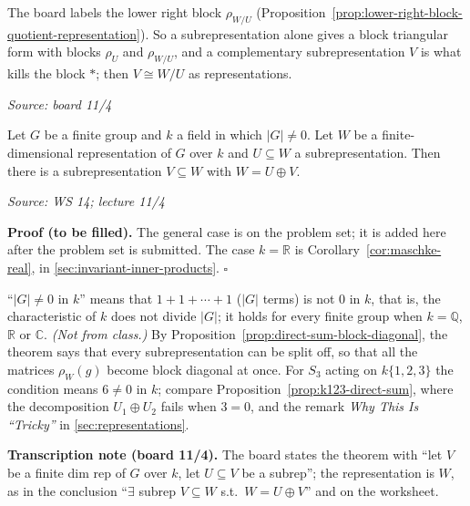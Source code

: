 \documentclass[11pt]{report}
\renewenvironment{proof}[1][Proof]{\noindent\textbf{#1.} }{\hfill$\square$\par\vspace{5pt}}
\newcommand{\srcline}[1]{\par\hfill{\footnotesize\textit{Source: #1}}}
\begin{document}
\begin{rembox}\label{rem:lower-right-block}
The board labels the lower right block $\rho_{W/U}$ (Proposition~\ref{prop:lower-right-block-quotient-representation}). So a subrepresentation alone gives a block triangular form with blocks $\rho_U$ and $\rho_{W/U}$, and a complementary subrepresentation $V$ is what kills the block $\ast$; then $V \cong W/U$ as representations.
\srcline{board 11/4}
\end{rembox}

\begin{thmbox}\label{thm:maschke}
Let $G$ be a finite group and $k$ a field in which $|G| \neq 0$. Let $W$ be a finite-dimensional representation of $G$ over $k$ and $U \subseteq W$ a subrepresentation. Then there is a subrepresentation $V \subseteq W$ with $W = U \oplus V$.
\srcline{WS 14; lecture 11/4}
\end{thmbox}

\begin{proof}[Proof (to be filled)]
The general case is on the problem set; it is added here after the problem set is submitted. The case $k = \mathbb{R}$ is Corollary~\ref{cor:maschke-real}, in \ref{sec:invariant-inner-products}.
\end{proof}

``$|G| \neq 0$ in $k$'' means that $1 + 1 + \cdots + 1$ ($|G|$ terms) is not $0$ in $k$, that is, the characteristic of $k$ does not divide $|G|$; it holds for every finite group when $k = \mathbb{Q}$, $\mathbb{R}$ or $\mathbb{C}$. \textit{(Not from class.)} By Proposition~\ref{prop:direct-sum-block-diagonal}, the theorem says that every subrepresentation can be split off, so that all the matrices $\rho_W(g)$ become block diagonal at once. For $S_3$ acting on $k\{1,2,3\}$ the condition means $6 \neq 0$ in $k$; compare Proposition~\ref{prop:k123-direct-sum}, where the decomposition $U_1 \oplus U_2$ fails when $3 = 0$, and the remark \emph{Why This Is ``Tricky''} in \ref{sec:representations}.

\textbf{Transcription note (board 11/4).} The board states the theorem with ``let $V$ be a finite dim rep of $G$ over $k$, let $U \subseteq V$ be a subrep''; the representation is $W$, as in the conclusion ``$\exists$ subrep $V \subseteq W$ s.t.\ $W = U \oplus V$'' and on the worksheet.

\end{document}
